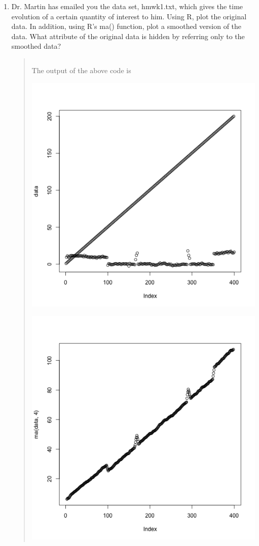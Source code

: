 \documentclass{hw}
\begin{document}

\begin{enumerate}
\item Dr. Martin has emailed you the data set, hmwk1.txt, which gives the time evolution of a certain
quantity of interest to him. Using R, plot the original data. In addition, using R’s ma() function, plot a
smoothed version of the data. What attribute of the original data is hidden by referring only to the
smoothed data?
\begin{quote}
\inputminted{r}{num_one.R}
The output of the above code is\\
\begin{minipage}{0.5\textwidth}
\includegraphics[scale=0.4]{01data_plot}
\end{minipage}
\begin{minipage}{0.5\textwidth}
\includegraphics[scale=0.4]{01data_smoothed}

\end{minipage}
\end{quote}
\end{enumerate}
\end{document}
